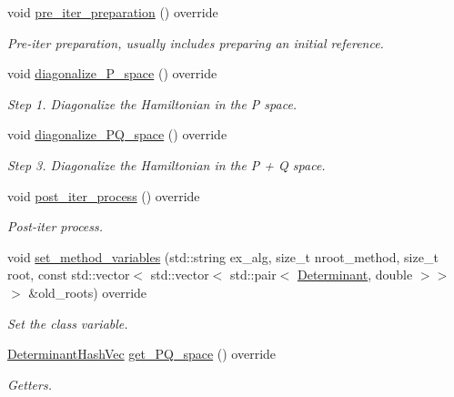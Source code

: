 \begin{DoxyCompactItemize}
void \mbox{\hyperlink{classforte_1_1_a_s_c_i_aff9c84376007b8ef5a54d90c3e6a1c52}{pre\+\_\+iter\+\_\+preparation}} () override
\begin{DoxyCompactList}\small\item\em Pre-\/iter preparation, usually includes preparing an initial reference. \end{DoxyCompactList}\item 
void \mbox{\hyperlink{classforte_1_1_a_s_c_i_a25123db39a9f99b446741bc2ec738ee8}{diagonalize\+\_\+\+P\+\_\+space}} () override
\begin{DoxyCompactList}\small\item\em Step 1. Diagonalize the Hamiltonian in the P space. \end{DoxyCompactList}\item 
void \mbox{\hyperlink{classforte_1_1_a_s_c_i_aa285dc9063075f23a7a1f4a1513c8aac}{diagonalize\+\_\+\+P\+Q\+\_\+space}} () override
\begin{DoxyCompactList}\small\item\em Step 3. Diagonalize the Hamiltonian in the P + Q space. \end{DoxyCompactList}\item 
void \mbox{\hyperlink{classforte_1_1_a_s_c_i_a0088675b12258f127476e15226ba822f}{post\+\_\+iter\+\_\+process}} () override
\begin{DoxyCompactList}\small\item\em Post-\/iter process. \end{DoxyCompactList}\item 
void \mbox{\hyperlink{classforte_1_1_a_s_c_i_aaf84a9fa2ec4f80da2cc05ac7ac544f9}{set\+\_\+method\+\_\+variables}} (std\+::string ex\+\_\+alg, size\+\_\+t nroot\+\_\+method, size\+\_\+t root, const std\+::vector$<$ std\+::vector$<$ std\+::pair$<$ \mbox{\hyperlink{namespaceforte_a2076c63fd7b8732004d9e1442ce527c1}{Determinant}}, double $>$$>$$>$ \&old\+\_\+roots) override
\begin{DoxyCompactList}\small\item\em Set the class variable. \end{DoxyCompactList}\item 
\mbox{\hyperlink{classforte_1_1_determinant_hash_vec}{Determinant\+Hash\+Vec}} \mbox{\hyperlink{classforte_1_1_a_s_c_i_abe4f88df4acd5e486cc1e9d43254bc0d}{get\+\_\+\+P\+Q\+\_\+space}} () override
\begin{DoxyCompactList}\small\item\em Getters. \end{DoxyCompactList}\item 

\end{DoxyCompactItemize}
